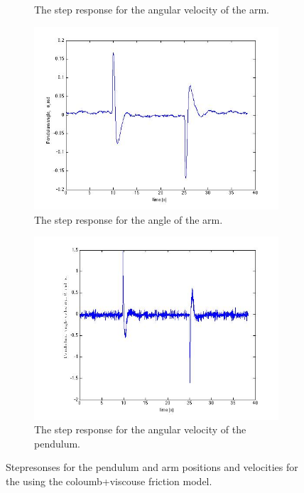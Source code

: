 \documentclass[10pt,a4paper]{article}
\begin{document}
\begin{figure}[H]
\begin{subfigure}[t]{0.49\textwidth}
			\centering
			\caption{The step response for the angular velocity of the arm.}
			\label{subfigure:srviscphidot}
		\end{subfigure}
		\begin{subfigure}[t]{0.49\textwidth}
			\includegraphics[scale=0.33]{plots/steprespvisctheta.jpg}
			\centering
			\caption{The step response for the angle of the arm.}			
			\label{subfigure:srvisctheta}
		\end{subfigure}
		\begin{subfigure}[t]{0.49\textwidth}
			\includegraphics[scale=0.33]{plots/steprespviscthetadot.jpg}
			\centering
			\caption{The step response for the angular velocity of the pendulum.}						
			\label{subfigure:srviscthetadot}
		\end{subfigure}
		\caption{Stepresonses for the pendulum and arm positions and velocities for the using the coloumb+viscouse friction model.}
		\label{fig:srvisc}
\end{figure}
\end{document}
